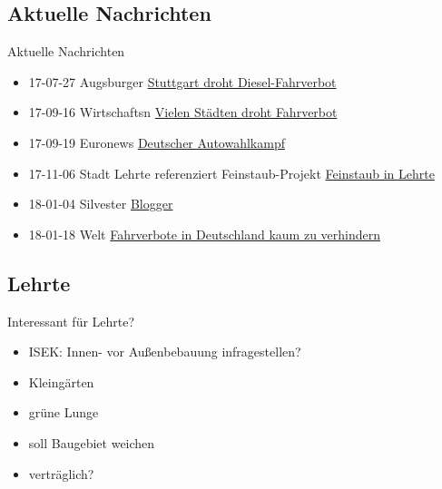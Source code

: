 \documentclass[aspectratio=169]{beamer} %
\begin{document}
\subsection{Aktuelle Nachrichten}
\begin{frame}{Aktuelle Nachrichten}
  \begin{itemize}
  \item 17-07-27 Augsburger \href{http://www.augsburger-allgemeine.de/panorama/In-Stuttgart-droht-jetzt-ein-Diesel-Fahrverbot-id42204121.html}{Stuttgart droht Diesel-Fahrverbot}
  \item 17-09-16 Wirtschaftsn \href{https://deutsche-wirtschafts-nachrichten.de/2017/09/16/feinstaub-belastung-vielen-staedten-drohen-fahrverbote/}{Vielen Städten droht Fahrverbot}
  \item 17-09-19 Euronews \href{http://de.euronews.com/2017/09/19/der-deutsche-autowahlkampf}{Deutscher Autowahlkampf}
  \item 17-11-06 Stadt Lehrte referenziert Feinstaub-Projekt \href{http://piratenpartei-lehrte.de/2017/09/11/feinstaub-in-lehrte/}{Feinstaub in Lehrte}
  \item 18-01-04 Silvester \href{https://sbamueller.wordpress.com/2018/01/01/silvester-und-feinstaub/}{Blogger}
  \item 18-01-18 Welt \href{https://www.welt.de/wirtschaft/article172580444/Fahrverbote-kann-Deutschland-kaum-noch-verhindern.html}{Fahrverbote in Deutschland kaum zu verhindern}
  \end{itemize}
\end{frame}

\subsection{Lehrte}
\begin{frame}{Interessant für Lehrte?}
  \begin{itemize}
  \item ISEK: Innen- vor Außenbebauung infragestellen?
  \item Kleingärten
  \item grüne Lunge
  \item soll Baugebiet weichen
  \item verträglich?
  \end{itemize}
\end{frame}
\end{document}
